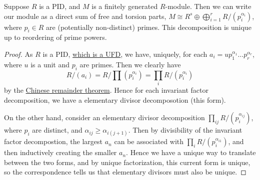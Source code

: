 \begin{theorem}\label{thm:structure-divisor}
    Suppose \(R\) is a PID,
    and \(M\) is a finitely generated \(R\)-module.
    Then we can write our module as a direct sum of free and torsion parts,
    \(M \cong R^s \oplus \bigoplus_{i=1}^r R/(p_i^{\alpha_i})\),
    where \(p_i \in R\) are (potentially non-distinct) primes.
    This decomposition is unique up to reordering of prime powers.
\end{theorem}
\begin{proof}
    As \(R\) is a PID, \hyperref[thm:pid-ufd]{which is a UFD},
    we have, uniquely, for each \(a_i = up_1^{\alpha_1} \hdots p_r^{\alpha_r}\),
    where \(u\) is a unit and \(p_i\) are primes.
    Then we clearly have
    \begin{equation*}
        R/(a_i) = R/\prod (p_i^{\alpha_i})
        = \prod_i R/(p_i^{\alpha_i})
    \end{equation*}
    by the \hyperref[thm:chinese]{Chinese remainder theorem}.
    Hence for each invariant factor decomposition,
    we have a elementary divisor decomposotion (this form).

    On the other hand, consider an elementary divisor decomposition
    \(\prod_{ij} R/(p_i^{\alpha_{ij}})\), where \(p_i\) are distinct,
    and \(\alpha_{ij} \geq \alpha_{i(j+1)}\).
    Then by divisibility of the invariant factor decompostion,
    the largest \(a_n\) can be associated with \(\prod_i R/(p_i^{\alpha_{i1}})\),
    and then inductively creating the smaller \(a_n\).
    Hence we have a unique way to translate between the two forms,
    and by unique factorization, this current form is unique,
    so the correspondence tells us that elementary divisors must also be unique.
\end{proof}

